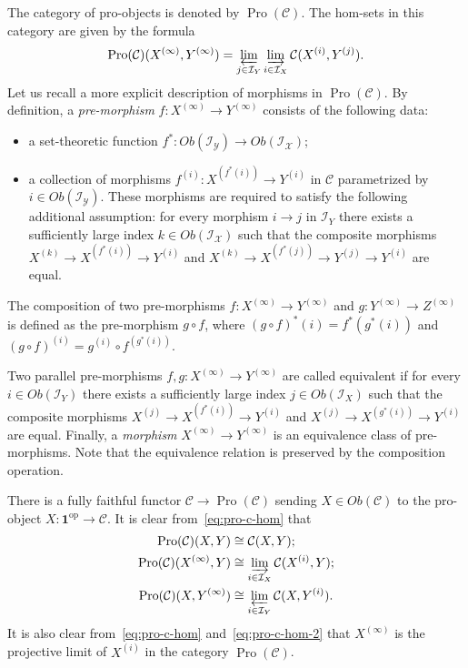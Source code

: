 \documentclass{article}
\newcommand{\rar}{\rightarrow}
\newcommand{\op}{\mathrm{op}}
\DeclareMathOperator{\Pro}{Pro}
\begin{document}
The category of pro-objects is denoted by \(\Pro(\mathcal C)\). The hom-sets in this category are given by the formula
\begin{equation} \label{eq:pro-c-hom} \Pro(\mathcal C)(X^{(\infty)}, Y^{(\infty)}) = \varprojlim_{j \in \mathcal I_Y} \varinjlim_{i \in \mathcal I_X} \mathcal C(X^{(i)}, Y^{(j)}). \end{equation}
Let us recall a more explicit description of morphisms in \(\Pro(\mathcal C)\). 
By definition, a {\it pre-morphism} \(f \colon X^{(\infty)} \rar Y^{(\infty)}\) consists of the following data:
\begin{itemize}
\item a set-theoretic function \(f^* \colon Ob(\mathcal{I_Y}) \to Ob(\mathcal{I_X})\);
\item a collection of morphisms \(f^{(i)} \colon X^{(f^*(i))} \rar Y^{(i)}\) in $\mathcal{C}$ parametrized by $i \in Ob(\mathcal{I_Y})$. These morphisms are required to satisfy the following additional assumption: for every morphism \(i \rar j\) in \(\mathcal I_Y\) there exists a sufficiently large index \(k \in Ob(\mathcal{I_X})\) such that the composite morphisms \(X^{(k)} \rar X^{(f^*(i))} \rar Y^{(i)}\) and \(X^{(k)} \rar X^{(f^*(j))} \rar Y^{(j)} \rar Y^{(i)}\) are equal. \end{itemize}
The composition of two pre-morphisms \(f \colon X^{(\infty)} \rar Y^{(\infty)}\) and \(g \colon Y^{(\infty)} \rar Z^{(\infty)}\) is defined as the pre-morphism \(g \circ f\), where \((g \circ f)^*(i) = f^*(g^*(i))\) and \((g \circ f)^{(i)} = g^{(i)} \circ f^{(g^*(i))}\).

Two parallel pre-morphisms \(f, g \colon X^{(\infty)} \rar Y^{(\infty)}\) are called equivalent if for every \(i \in Ob(\mathcal I_Y)\) there exists a sufficiently large index \(j \in Ob(\mathcal I_X)\) such that the composite morphisms \(X^{(j)} \rar X^{(f^*(i))} \rar Y^{(i)}\) and \(X^{(j)} \rar X^{(g^*(i))} \rar Y^{(i)}\) are equal. Finally, a {\it morphism} \(X^{(\infty)} \rar Y^{(\infty)}\) is an equivalence class of pre-morphisms. Note that the equivalence relation is preserved by the composition operation.

There is a fully faithful functor $\mathcal{C} \to \Pro(\mathcal{C})$ sending \(X \in Ob(\mathcal C)\) to the pro-object $X \colon \mathbf{1}^\op \to \mathcal{C}$. It is clear from~\eqref{eq:pro-c-hom}  that
\begin{align}
 \Pro(\mathcal C)(X, Y) &\cong \mathcal C(X, Y);\\
 \Pro(\mathcal C)(X^{(\infty)}, Y) &\cong \varinjlim_{i \in \mathcal I_X} \mathcal C(X^{(i)}, Y); \label{eq:pro-c-hom-2}\\
 \Pro(\mathcal C)(X, Y^{(\infty)}) &\cong \varprojlim_{i \in \mathcal I_Y} \mathcal C(X, Y^{(i)}).
\end{align}
It is also clear from~\eqref{eq:pro-c-hom} and~\eqref{eq:pro-c-hom-2} that \(X^{(\infty)}\) is the projective limit of \(X^{(i)}\) in the category \(\Pro(\mathcal C)\).
\end{document}
